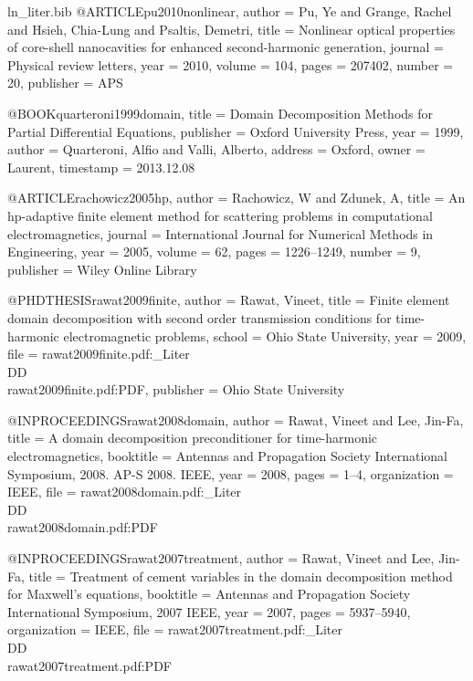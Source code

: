 \begin{filecontents*}{ln_liter.bib}
@ARTICLE{pu2010nonlinear,
  author = {Pu, Ye and Grange, Rachel and Hsieh, Chia-Lung and Psaltis, Demetri},
  title = {Nonlinear optical properties of core-shell nanocavities for enhanced
	second-harmonic generation},
  journal = {Physical review letters},
  year = {2010},
  volume = {104},
  pages = {207402},
  number = {20},
  publisher = {APS}
}

@BOOK{quarteroni1999domain,
  title = {Domain Decomposition Methods for Partial Differential Equations},
  publisher = {Oxford University Press},
  year = {1999},
  author = {Quarteroni, Alfio and Valli, Alberto},
  address = {Oxford},
  owner = {Laurent},
  timestamp = {2013.12.08}
}

@ARTICLE{rachowicz2005hp,
  author = {Rachowicz, W and Zdunek, A},
  title = {An hp-adaptive finite element method for scattering problems in computational
	electromagnetics},
  journal = {International Journal for Numerical Methods in Engineering},
  year = {2005},
  volume = {62},
  pages = {1226--1249},
  number = {9},
  publisher = {Wiley Online Library}
}

@PHDTHESIS{rawat2009finite,
  author = {Rawat, Vineet},
  title = {Finite element domain decomposition with second order transmission
	conditions for time-harmonic electromagnetic problems},
  school = {Ohio State University},
  year = {2009},
  file = {rawat2009finite.pdf:_Liter\\DD\\rawat2009finite.pdf:PDF},
  publisher = {Ohio State University}
}

@INPROCEEDINGS{rawat2008domain,
  author = {Rawat, Vineet and Lee, Jin-Fa},
  title = {A domain decomposition preconditioner for time-harmonic electromagnetics},
  booktitle = {Antennas and Propagation Society International Symposium, 2008. AP-S
	2008. IEEE},
  year = {2008},
  pages = {1--4},
  organization = {IEEE},
  file = {rawat2008domain.pdf:_Liter\\DD\\rawat2008domain.pdf:PDF}
}

@INPROCEEDINGS{rawat2007treatment,
  author = {Rawat, Vineet and Lee, Jin-Fa},
  title = {Treatment of cement variables in the domain decomposition method
	for {M}axwell’s equations},
  booktitle = {Antennas and Propagation Society International Symposium, 2007 IEEE},
  year = {2007},
  pages = {5937--5940},
  organization = {IEEE},
  file = {rawat2007treatment.pdf:_Liter\\DD\\rawat2007treatment.pdf:PDF}
}


\end{filecontents*}
